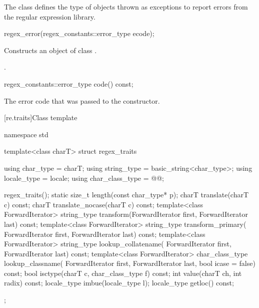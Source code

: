 \pnum
The class  defines the type of objects thrown as
exceptions to report errors from the regular expression library.

%
\begin{itemdecl}
regex_error(regex_constants::error_type ecode);
\end{itemdecl}

\begin{itemdescr}
\pnum\effects  Constructs an object of class .

\pnum\ensures  {}.
\end{itemdescr}

%
%
\begin{itemdecl}
regex_constants::error_type code() const;
\end{itemdecl}

\begin{itemdescr}
\pnum\returns The error code that was passed to the constructor.
\end{itemdescr}

[re.traits]{Class template }
%
\begin{codeblock}
namespace std {
  template<class charT>
    struct regex_traits {
      using char_type       = charT;
      using string_type     = basic_string<char_type>;
      using locale_type     = locale;
      using char_class_type = @@;

      regex_traits();
      static size_t length(const char_type* p);
      charT translate(charT c) const;
      charT translate_nocase(charT c) const;
      template<class ForwardIterator>
        string_type transform(ForwardIterator first, ForwardIterator last) const;
      template<class ForwardIterator>
        string_type transform_primary(
          ForwardIterator first, ForwardIterator last) const;
      template<class ForwardIterator>
        string_type lookup_collatename(
          ForwardIterator first, ForwardIterator last) const;
      template<class ForwardIterator>
        char_class_type lookup_classname(
          ForwardIterator first, ForwardIterator last, bool icase = false) const;
      bool isctype(charT c, char_class_type f) const;
      int value(charT ch, int radix) const;
      locale_type imbue(locale_type l);
      locale_type getloc() const;
    };
}
\end{codeblock}

